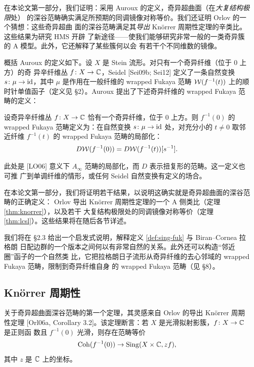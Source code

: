 在本论文第一部分，我们证明：采用 Auroux 的定义，奇异超曲面（在\emph{大复结构极限}处）
的深谷范畴确实满足所预期的同调镜像对称等价。我们还证明 Orlov 的一个猜想：这些奇异超曲
面的深谷范畴满足其\emph{导出} Kn{\"o}rrer 周期性定理的辛类比。这些结果为研究 HMS 开辟
了新途径——使我们能够研究非常一般的一类奇异簇的 A 模型。此外，它还解释了某些簇何以会
有若干个不同维数的镜像。

概括 Auroux 的定义如下。设 $X$ 是 Stein 流形。对只有一个奇异纤维（位于 $0$ 上方）的奇
异辛纤维丛 $f\colon X\to\mathbb{C}$，Seidel [Sei09b; Sei12] 定义了一条自然变换
$s\colon\mu\to\mathrm{id}$，其中 $\mu$ 是作用在一般纤维的 wrapped Fukaya 范畴
$\mathcal{W}(f^{-1}(t))$ 上的顺时针单值函子（定义见 §2）。Auroux 提出了下述奇异纤维的 wrapped
Fukaya 范畴的定义：

\begin{definition}[Auroux]\label{def:sing-fuk}
设奇异辛纤维丛 $f\colon X\to\mathbb{C}$ 恰有一个奇异纤维，位于 $0$ 上方。则 $f^{-1}(0)$ 的
wrapped Fukaya 范畴定义为：在自然变换 $s\colon\mu\to\mathrm{id}$ 处，对充分小的 $t\neq0$ 取邻
近纤维 $f^{-1}(t)$ 的 wrapped Fukaya 范畴的局部化：
\[
D\mathcal{W}(f^{-1}(0))=D\mathcal{W}(f^{-1}(t))[s^{-1}].
\]
\end{definition}

此处是 [LO06] 意义下 $A_\infty$ 范畴的局部化，而 $D$ 表示扭复形的范畴。这一定义也可推
广到单调纤维的情形，或任何 Seidel 自然变换有定义的场合。


在本论文第一部分，我们将证明若干结果，以说明这确实就是奇异超曲面的深谷范畴的正确定义：
Orlov 导出 Kn{\"o}rrer 周期性定理的一个 A 侧类比（定理 \ref{thm:knorrer}），以及若干
大复结构极限处的同调镜像对称等价（定理 \ref{thm:lcsl}）。这些结果将在随后各节详述。

我们将在 §2.3 给出一个启发式说明，解释定义 \ref{def:sing-fuk} 与 Biran--Cornea 拉格朗
日配边群的一个版本之间何以有非常自然的关系。此外还可以构造“邻近圈”函子的一个自然类
比，它把拉格朗日子流形从奇异纤维的去心邻域的 wrapped Fukaya 范畴，限制到奇异纤维自身
的 wrapped Fukaya 范畴（见 §8）。

\subsection{Kn{\"o}rrer 周期性}

关于奇异超曲面深谷范畴的第一个定理，其灵感来自 Orlov 的导出 Kn{\"o}rrer 周期性定理
[Orl06a, Corollary 3.2]。该定理断言：若 $X$ 是光滑拟射影簇，$f\colon X\to\mathbb{C}$ 是正则函
数且 $f^{-1}(0)$ 光滑，则存在范畴等价
\[
\operatorname{Coh}(f^{-1}(0))\to\operatorname{Sing}(X\times\mathbb{C},zf),
\]
其中 $z$ 是 $\mathbb{C}$ 上的坐标。

